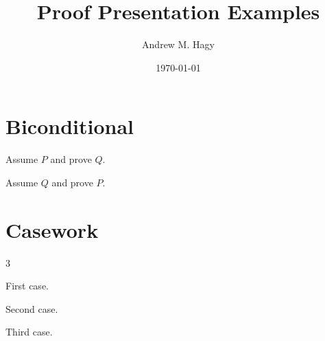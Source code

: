 \documentclass[11pt,letterpaper]{article}
\title{Proof Presentation Examples}
\author{Andrew M. Hagy}
\date{\today}
\begin{document}
\AndyMakeTitle
\section{Biconditional}
\begin{IffForwardProof}[QED]
Assume $P$ and prove $Q$.
\end{IffForwardProof}
\begin{IffBackwardProof}[AXM]
Assume $Q$ and prove $P$.
\end{IffBackwardProof}
\section{Casework}
\begin{CaseProof}{3}
\begin{AndyCase}
First case.
\end{AndyCase}
\begin{AndyCase}
Second case.
\end{AndyCase}
\begin{AndyCase}
Third case.
\end{AndyCase}
\end{CaseProof}
\AndyProofNotationAppendix
\AndyOrnamentBreak
\end{document}
